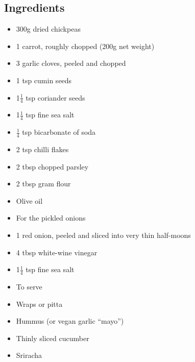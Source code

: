 \documentclass{book}
\begin{document}
\subsection*{Ingredients}
\begin{itemize}
\item 300g dried chickpeas
\item 1 carrot, roughly chopped (200g net weight)
\item 3 garlic cloves, peeled and chopped
\item 1 tsp cumin seeds
\item 1$\frac{1}{4}$ tsp coriander seeds
\item 1$\frac{1}{4}$ tsp fine sea salt
\item $\frac{1}{4}$ tsp bicarbonate of soda
\item 2 tsp chilli flakes
\item 2 tbsp chopped parsley
\item 2 tbsp gram flour
\item Olive oil
\end{itemize}

\begin{itemize}
\item For the pickled onions
\item 1 red onion, peeled and sliced into very thin half-moons
\item 4 tbsp white-wine vinegar
\item 1$\frac{1}{4}$ tsp fine sea salt
\end{itemize}

\begin{itemize}
\item To serve
\item Wraps or pitta
\item Hummus (or vegan garlic “mayo”)
\item Thinly sliced cucumber
\item Sriracha
\end{itemize}
\end{document}
